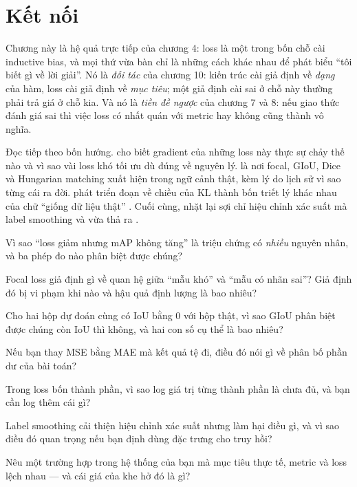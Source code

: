 \documentclass[../../deep_learning.tex]{subfiles}
\begin{document}
\section{Kết nối}

Chương này là hệ quả trực tiếp của chương 4: loss là một trong bốn chỗ cài inductive bias, và mọi thứ vừa bàn chỉ là những cách khác nhau để phát biểu ``tôi biết gì về lời giải''. Nó là \emph{đối tác} của chương 10: kiến trúc cài giả định về \emph{dạng} của hàm, loss cài giả định về \emph{mục tiêu}; một giả định cài sai ở chỗ này thường phải trả giá ở chỗ kia. Và nó là \emph{tiền đề ngược} của chương 7 và 8: nếu giao thức đánh giá sai thì việc loss có nhất quán với metric hay không cũng thành vô nghĩa.

Đọc tiếp theo bốn hướng.  cho biết gradient của những loss này thực sự chảy thế nào và vì sao vài loss khó tối ưu dù đúng về nguyên lý.  là nơi focal, GIoU, Dice và Hungarian matching xuất hiện trong ngữ cảnh thật, kèm lý do lịch sử vì sao từng cái ra đời.  phát triển đoạn về chiều của KL thành bốn triết lý khác nhau của chữ ``giống dữ liệu thật'' \cite{blau2018perception}. Cuối cùng,  nhặt lại sợi chỉ hiệu chỉnh xác suất mà label smoothing và  vừa thả ra \cite{guo2017calibration}.

\begin{tukiem}
\item Vì sao ``loss giảm nhưng mAP không tăng'' là triệu chứng có \emph{nhiều} nguyên nhân, và ba phép đo nào phân biệt được chúng?
\item Focal loss giả định gì về quan hệ giữa ``mẫu khó'' và ``mẫu có nhãn sai''? Giả định đó bị vi phạm khi nào và hậu quả định lượng là bao nhiêu?
\item Cho hai hộp dự đoán cùng có IoU bằng 0 với hộp thật, vì sao GIoU phân biệt được chúng còn IoU thì không, và hai con số cụ thể là bao nhiêu?
\item Nếu bạn thay MSE bằng MAE mà kết quả tệ đi, điều đó nói gì về phân bố phần dư của bài toán?
\item Trong loss bốn thành phần, vì sao log giá trị từng thành phần là chưa đủ, và bạn cần log thêm cái gì?
\item Label smoothing cải thiện hiệu chỉnh xác suất nhưng làm hại điều gì, và vì sao điều đó quan trọng nếu bạn định dùng đặc trưng cho truy hồi?
\item Nêu một trường hợp trong hệ thống của bạn mà mục tiêu thực tế, metric và loss lệch nhau --- và cái giá của khe hở đó là gì?
\end{tukiem}

\ifSubfilesClassLoaded{\printbibliography[title={Nguồn}]}{}
\end{document}
